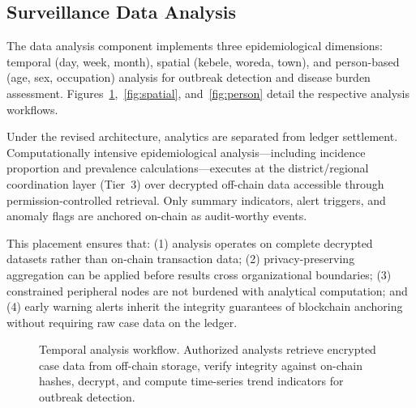 \documentclass[AMA,LATO1COL]{WileyNJD-v2}
\begin{document}
\subsection{Surveillance Data Analysis}\label{subsec:analysis}

The data analysis component implements three epidemiological dimensions: temporal (day, week, month), spatial (kebele, woreda, town), and person-based (age, sex, occupation) analysis for outbreak detection and disease burden assessment. Figures~\ref{fig:temporal},~\ref{fig:spatial}, and~\ref{fig:person} detail the respective analysis workflows.

Under the revised architecture, analytics are separated from ledger settlement. Computationally intensive epidemiological analysis---including incidence proportion and prevalence calculations---executes at the district/regional coordination layer (Tier~3) over decrypted off-chain data accessible through permission-controlled retrieval. Only summary indicators, alert triggers, and anomaly flags are anchored on-chain as audit-worthy events.

This placement ensures that: (1) analysis operates on complete decrypted datasets rather than on-chain transaction data; (2) privacy-preserving aggregation can be applied before results cross organizational boundaries; (3) constrained peripheral nodes are not burdened with analytical computation; and (4) early warning alerts inherit the integrity guarantees of blockchain anchoring without requiring raw case data on the ledger.


\begin{figure}[!ht]
\centering
{}
\caption{Temporal analysis workflow. Authorized analysts retrieve encrypted case data from off-chain storage, verify integrity against on-chain hashes, decrypt, and compute time-series trend indicators for outbreak detection.}\label{fig:temporal}
\end{figure}

%
%
%
\end{document}
